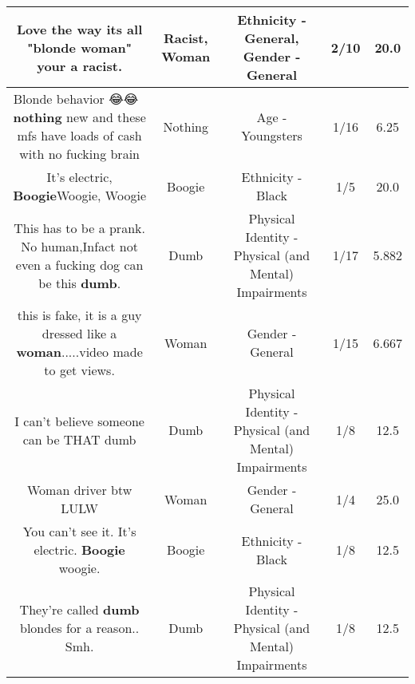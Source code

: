 \documentclass[11pt]{article}
\newlength\mylength
\begin{document}
\begin{center}
\begin{longtable}{|C{.65\mylength}|C{.30\mylength}|C{.12\mylength}|C{.12\mylength}|C{.12\mylength}|}
  \small Love the way its all "blonde \textbf{woman}"  your a \textbf{racist}.\normalsize   & Racist, Woman & Ethnicity - General, Gender - General & 2/10 & 20.0 \\  \hline
  \small Blonde behavior 😂😂🤦‍♂️ \textbf{nothing} new and these mfs have loads of cash with no fucking brain\normalsize   & Nothing & Age - Youngsters & 1/16 & 6.25 \\  \hline
  \small It's electric, \textbf{Boogie}Woogie, Woogie\normalsize   & Boogie & Ethnicity - Black & 1/5 & 20.0 \\  \hline
  \small This has to be a prank. No human,Infact not even a fucking dog can be this \textbf{dumb}.\normalsize   & Dumb & Physical Identity - Physical (and Mental) Impairments & 1/17 & 5.882 \\  \hline
  \small this is fake, it is a guy dressed like a \textbf{woman}.....video made to get views.\normalsize   & Woman & Gender - General & 1/15 & 6.667 \\  \hline
  \small I can't believe someone can be THAT dumb\normalsize   & Dumb & Physical Identity - Physical (and Mental) Impairments & 1/8 & 12.5 \\  \hline
  \small Woman driver btw LULW\normalsize   & Woman & Gender - General & 1/4 & 25.0 \\  \hline
  \small You can't see it. It's electric. \textbf{Boogie} woogie.\normalsize   & Boogie & Ethnicity - Black & 1/8 & 12.5 \\  \hline
  \small They're called \textbf{dumb} blondes for a reason.. Smh.\normalsize   & Dumb & Physical Identity - Physical (and Mental) Impairments & 1/8 & 12.5 \\  \hline

\end{longtable}
\end{center}
\end{document}
